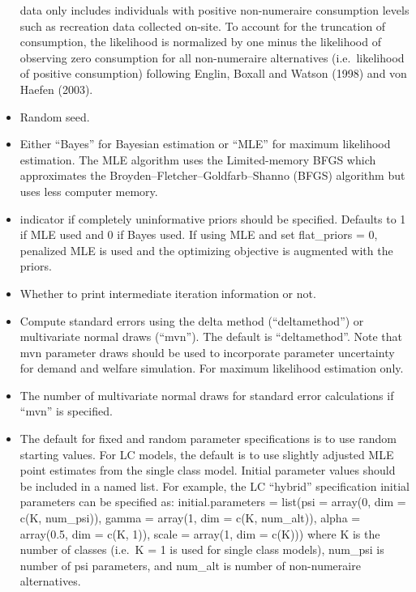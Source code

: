 \begin{itemize}
  data only includes individuals with positive non-numeraire consumption
  levels such as recreation data collected on-site. To account for the
  truncation of consumption, the likelihood is normalized by one minus
  the likelihood of observing zero consumption for all non-numeraire
  alternatives (i.e.~likelihood of positive consumption) following
  Englin, Boxall and Watson (1998) and von Haefen (2003).
\item
   Random seed.
\item
   Either ``Bayes'' for Bayesian estimation or ``MLE''
  for maximum likelihood estimation. The MLE algorithm uses the
  Limited-memory BFGS which approximates the
  Broyden--Fletcher--Goldfarb--Shanno (BFGS) algorithm but uses less
  computer memory.
\item
   indicator if completely uninformative priors
  should be specified. Defaults to 1 if MLE used and 0 if Bayes used. If
  using MLE and set flat\_priors = 0, penalized MLE is used and the
  optimizing objective is augmented with the priors.
\item
   Whether to print intermediate iteration
  information or not.
\item
   Compute standard errors using the delta method
  (``deltamethod'') or multivariate normal draws (``mvn''). The default
  is ``deltamethod''. Note that mvn parameter draws should be used to
  incorporate parameter uncertainty for demand and welfare simulation.
  For maximum likelihood estimation only.
\item
   The number of multivariate normal draws for standard
  error calculations if ``mvn'' is specified.
\item
   The default for fixed and random parameter
  specifications is to use random starting values. For LC models, the
  default is to use slightly adjusted MLE point estimates from the
  single class model. Initial parameter values should be included in a
  named list. For example, the LC ``hybrid'' specification initial
  parameters can be specified as: initial.parameters = list(psi =
  array(0, dim = c(K, num\_psi)), gamma = array(1, dim = c(K,
  num\_alt)), alpha = array(0.5, dim = c(K, 1)), scale = array(1, dim =
  c(K))) where K is the number of classes (i.e.~K = 1 is used for single
  class models), num\_psi is number of psi parameters, and num\_alt is
  number of non-numeraire alternatives.
\end{itemize}

